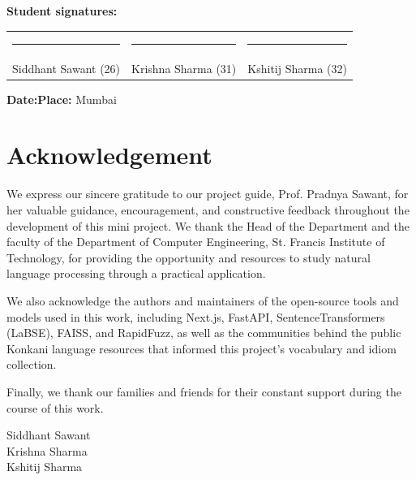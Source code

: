 \documentclass[12pt,a4paper]{article}
\let\oldsection\section
\renewcommand{\section}{\clearpage\oldsection}
\begin{document}
\vspace{2cm}
\noindent\textbf{Student signatures:}\\[1.5cm]
\begin{tabularx}{\textwidth}{XXX}
\rule{4.2cm}{0.4pt} & \rule{4.2cm}{0.4pt} & \rule{4.2cm}{0.4pt}\\
Siddhant Sawant (26) & Krishna Sharma (31) & Kshitij Sharma (32)\\
\end{tabularx}

\vspace{1.5cm}
\noindent\textbf{Date:}\hspace{6cm}\textbf{Place:} Mumbai
\newpage

\section*{\centering Acknowledgement}

\vspace{0.5cm}
\begin{justify}
We express our sincere gratitude to our project guide, Prof. Pradnya Sawant, for her valuable guidance, encouragement, and constructive feedback throughout the development of this mini project. We thank the Head of the Department and the faculty of the Department of Computer Engineering, St. Francis Institute of Technology, for providing the opportunity and resources to study natural language processing through a practical application.

We also acknowledge the authors and maintainers of the open-source tools and models used in this work, including Next.js, FastAPI, SentenceTransformers (LaBSE), FAISS, and RapidFuzz, as well as the communities behind the public Konkani language resources that informed this project's vocabulary and idiom collection.

Finally, we thank our families and friends for their constant support during the course of this work.
\end{justify}

\vspace{1.5cm}
\begin{flushright}
Siddhant Sawant\\
Krishna Sharma\\
Kshitij Sharma
\end{flushright}
\newpage
\end{document}

